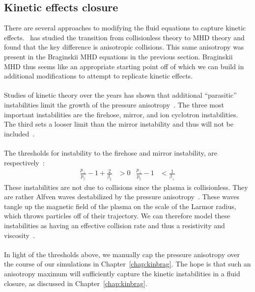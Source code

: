 \subsection{Kinetic effects closure}\label{ssec:kinclosure}
There are several approaches to modifying the fluid equations to capture kinetic effects.~\citet{Sharma2003} has studied the transition from collisionless theory to MHD theory and found that the key difference is anisotropic collisions. This same anisotropy was present in the Braginskii MHD equations in the previous section. Braginskii MHD thus seems like an appropriate starting point off of which we can build in additional modifications to attempt to replicate kinetic effects.\\
\\
Studies of kinetic theory over the years has shown that additional ``parasitic'' instabilities limit the growth of the pressure anisotropy~\cite{SharmaThesis, Kunz2016}. The three most important instabilities are the firehose, mirror, and ion cyclotron instabilities. The third sets a looser limit than the mirror instability and thus will not be included~\cite{Sharma2006,Riquelme2015}. \\
\\
The thresholds for instability to the firehose and mirror instability, are respectively~\cite{Kunz2016,Kunz2014,Schekochihin2008,Sharma2006}:
\begin{align}
  \frac{p_\perp}{p_\parallel}-1+\frac2{\beta_\parallel}&>0 & \frac{p_\perp}{p_\parallel}-1&<\frac{1}{\beta_\perp} \label{eq:mirrorthresh}
\end{align}
These instabilities are not due to collisions since the plasma is collisionless. They are rather Alfven waves destabilized by the pressure anisotropy~\cite{Sharma2006}. These waves tangle up the magnetic field of the plasma on the scale of the Larmor radius, which throws particles off of their trajectory. We can therefore model these instabilities as having an effective collision rate and thus a resistivity and viscosity~\cite{Schekochihin2008}.\\
\\
In light of the thresholds above, we manually cap the pressure anisotropy over the course of our simulations in Chapter~\ref{chap:kinbrag}. The hope is that such an anisotropy maximum will sufficiently capture the kinetic instabilities in a fluid closure, as discussed in Chapter~\ref{chap:kinbrag}.


